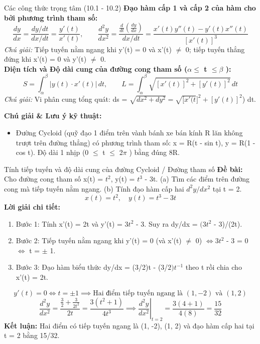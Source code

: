 \documentclass[11pt,a4paper,oneside]{book}
\begin{document}
\begin{congthuc}{Các công thức trọng tâm (10.1 - 10.2)}
\noindent\textbf{Đạo hàm cấp 1 và cấp 2 của hàm cho bởi phương trình tham số:}
\[ \frac{dy}{dx} = \frac{dy/dt}{dx/dt} = \frac{y'(t)}{x'(t)}, \qquad \frac{d^2y}{dx^2} = \frac{\frac{d}{dt}\left(\frac{dy}{dx}\right)}{dx/dt} = \frac{x'(t)y''(t) - y'(t)x''(t)}{[x'(t)]^3} \]
\noindent\textit{Chú giải:} Tiếp tuyến nằm ngang khi y'(t) = 0 và x'(t) $\neq$  0; tiếp tuyến thẳng đứng khi x'(t) = 0 và y'(t) $\neq$  0.\\[4pt]
\noindent\textbf{Diện tích và Độ dài cung của đường cong tham số ($\alpha \le$  t $\le \beta$ ):}
\[ S = \int_\alpha^\beta |y(t) \cdot x'(t)|\,dt, \qquad L = \int_\alpha^\beta \sqrt{[x'(t)]^2 + [y'(t)]^2}\,dt \]
\noindent\textit{Chú giải:} Vi phân cung tổng quát: ds = $\sqrt{dx^2 + dy^2} = \sqrt{[x'(t} ]^2 + [y'(t)]^2$) dt.\\[4pt]
\end{congthuc}

\noindent\textbf{Chú giải \& Lưu ý kỹ thuật:}
\begin{itemize}[leftmargin=1.5em, itemsep=2pt]
  \item Đường Cycloid (quỹ đạo 1 điểm trên vành bánh xe bán kính R lăn không trượt trên đường thẳng) có phương trình tham số: x = R(t - sin t), y = R(1 - cos t). Độ dài 1 nhịp (0 $\le$  t $\le$  2$\pi$ ) bằng đúng 8R.
\end{itemize}

\begin{vidu}{Tính tiếp tuyến và độ dài cung của đường Cycloid / Đường tham số}
\textbf{Đề bài:} Cho đường cong tham số x(t) = $t^2$, y(t) = $t^3$ - 3t. (a) Tìm các điểm trên đường cong mà tiếp tuyến nằm ngang. (b) Tính đạo hàm cấp hai $d^2y / dx^2$ tại t = 2.
\[ x(t) = t^2, \quad y(t) = t^3 - 3t \]
\textbf{Lời giải chi tiết:}
\begin{enumerate}[leftmargin=1.5em, itemsep=2pt]
  \item Bước 1: Tính x'(t) = 2t và y'(t) = $3t^2$ - 3. Suy ra dy/dx = $(3t^2$ - 3)/(2t).
  \item Bước 2: Tiếp tuyến nằm ngang khi y'(t) = 0 (và x'(t) $\neq$  0) $\iff 3t^2$ - 3 = 0 $\iff$  t = $\pm$ 1.
  \item Bước 3: Đạo hàm biểu thức dy/dx = (3/2)t - (3/$2)t^{-1}$ theo t rồi chia cho x'(t) = 2t.
\end{enumerate}
\[ y'(t) = 0 \iff t = \pm 1 \implies \text{Hai điểm tiếp tuyến ngang là } (1, -2) \text{ và } (1, 2) \]
\[ \frac{d^2y}{dx^2} = \frac{\frac{3}{2} + \frac{3}{2t^2}}{2t} = \frac{3(t^2 + 1)}{4t^3} \implies \left.\frac{d^2y}{dx^2}\right|_{t=2} = \frac{3(4 + 1)}{4(8)} = \frac{15}{32} \]
\noindent\textbf{Kết luận:} Hai điểm có tiếp tuyến ngang là (1, -2), (1, 2) và đạo hàm cấp hai tại t = 2 bằng 15/32.
\end{vidu}
\end{document}
